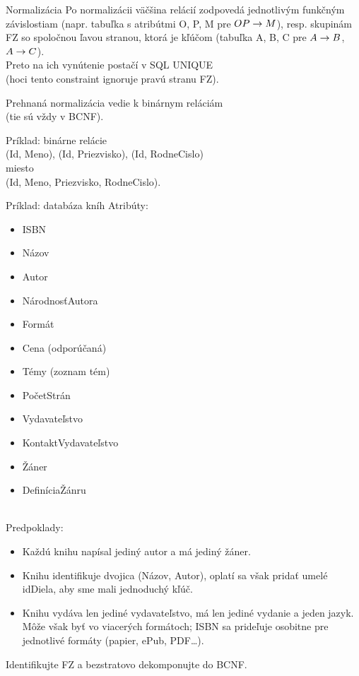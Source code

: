 \documentclass[12pt]{beamer}
\begin{document}
\begin{frame}[fragile]{Normalizácia}
Po normalizácii väčšina relácií zodpovedá jednotlivým funkčným závislostiam (napr. tabuľka s atribútmi O, P, M pre $OP\rightarrow M$),
resp. skupinám FZ so spoločnou ľavou stranou, ktorá je kľúčom (tabuľka A, B, C pre $A\rightarrow B$, $A\rightarrow C$).\\
Preto na ich vynútenie postačí v SQL UNIQUE\\
(hoci tento constraint ignoruje pravú stranu FZ).
\bigskip

Prehnaná normalizácia vedie k binárnym reláciám\\
(tie sú vždy v BCNF).

\bigskip
Príklad: binárne relácie\\
(Id, Meno), (Id, Priezvisko), (Id, RodneCislo)\\
miesto\\
(Id, Meno, Priezvisko, RodneCislo).
\end{frame}

\begin{frame}[fragile]{Príklad: databáza kníh}
Atribúty:\\[3mm]
\begin{minipage}{.4\pdfpagewidth}
\scriptsize
\begin{itemize}
\item ISBN
\item Názov
\item Autor
\item NárodnosťAutora
\item Formát
\item Cena (odporúčaná)
\end{itemize}
\end{minipage}
\begin{minipage}{.4\pdfpagewidth}
\scriptsize
\begin{itemize}
\item Témy (zoznam tém)
\item PočetStrán
\item Vydavateľstvo
\item KontaktVydavateľstvo
\item Žáner
\item DefiníciaŽánru
\end{itemize}
\end{minipage}
\\[3mm]
Predpoklady:
{
\footnotesize
\begin{itemize}
\item Každú knihu napísal jediný autor a má jediný žáner.
\item Knihu identifikuje dvojica (Názov, Autor), oplatí sa však pridať umelé idDiela, aby sme mali jednoduchý kľúč.
\item Knihu vydáva len jediné vydavateľstvo, má len jediné vydanie a jeden jazyk.
    Môže však byť vo viacerých formátoch; ISBN sa prideľuje osobitne pre jednotlivé formáty (papier, ePub, PDF\dots).
\end{itemize}
}
Identifikujte FZ a bezstratovo dekomponujte do BCNF.
\end{frame}
\end{document}
